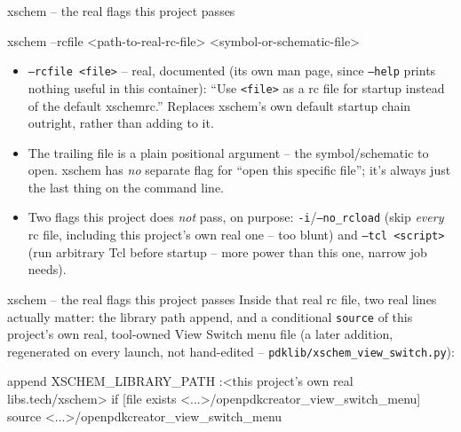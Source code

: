 \documentclass[aspectratio=169]{beamer}
\begin{document}
\begin{frame}[fragile]{xschem -- the real flags this project passes}
\begin{cli}
xschem --rcfile <path-to-real-rc-file> <symbol-or-schematic-file>
\end{cli}
\begin{itemize}
  \item \texttt{--rcfile <file>} -- real, documented (its own man
        page, since \texttt{--help} prints nothing useful in this
        container): ``Use \texttt{<file>} as a rc file for startup
        instead of the default xschemrc.'' Replaces xschem's own
        default startup chain outright, rather than adding to it.
  \item The trailing file is a plain positional argument -- the
        symbol/schematic to open. xschem has \emph{no} separate flag
        for ``open this specific file''; it's always just the last
        thing on the command line.
  \item Two flags this project does \emph{not} pass, on purpose:
        \texttt{-i}/\texttt{--no\_rcload} (skip \emph{every} rc file,
        including this project's own real one -- too blunt) and
        \texttt{--tcl <script>} (run arbitrary Tcl before startup --
        more power than this one, narrow job needs).
\end{itemize}
\end{frame}
\begin{frame}[fragile]{xschem -- the real flags this project passes}
Inside that real rc file, two real lines actually matter: the library
path append, and a conditional \texttt{source} of this project's own
real, tool-owned View Switch menu file (a later addition, regenerated
on every launch, not hand-edited -- \texttt{pdklib/xschem\_view\_switch.py}):
\begin{cli}
append XSCHEM_LIBRARY_PATH :<this project's own real libs.tech/xschem>
if {[file exists <...>/openpdkcreator_view_switch_menu]} {
  source <...>/openpdkcreator_view_switch_menu
}
\end{cli}
\end{frame}
\end{document}
